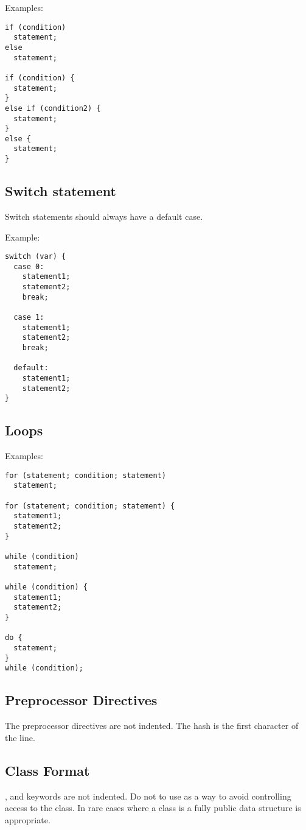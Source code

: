 Examples:
\begin{lstlisting}
if (condition)
  statement;
else
  statement;

if (condition) {
  statement;
}
else if (condition2) {
  statement;
}
else {
  statement;
}
\end{lstlisting}

\subsection{Switch statement}

Switch statements should always have a default case.

Example:
\begin{lstlisting}
switch (var) {
  case 0:
    statement1;
    statement2;
    break;

  case 1:
    statement1;
    statement2;
    break;

  default:
    statement1;
    statement2;
}
\end{lstlisting}

\subsection{Loops}

Examples:
\begin{lstlisting}
for (statement; condition; statement)
  statement;

for (statement; condition; statement) {
  statement1;
  statement2;
}

while (condition)
  statement;

while (condition) {
  statement1;
  statement2;
}

do {
  statement;
}
while (condition);
\end{lstlisting}

\subsection{Preprocessor Directives}
The preprocessor directives are not indented.
The hash is the first character of the line.

\subsection{Class Format}
\label{subsec:class_format}
,  and  keywords are not indented.
Do not to use  as a way to avoid controlling access to the class. In rare cases where
a class is a fully public data structure  is appropriate.

